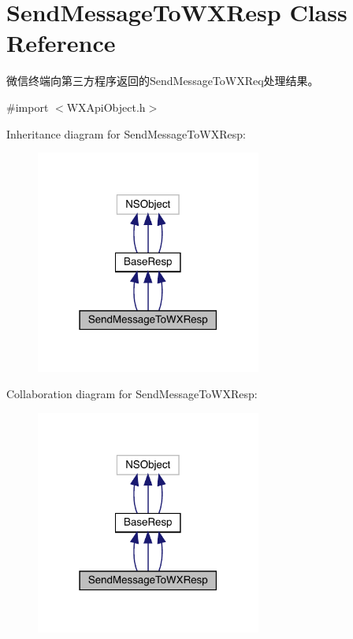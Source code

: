 \hypertarget{interface_send_message_to_w_x_resp}{}\section{Send\+Message\+To\+W\+X\+Resp Class Reference}
\label{interface_send_message_to_w_x_resp}


微信终端向第三方程序返回的\+Send\+Message\+To\+W\+X\+Req处理结果。  




{\ttfamily \#import $<$W\+X\+Api\+Object.\+h$>$}



Inheritance diagram for Send\+Message\+To\+W\+X\+Resp\+:\nopagebreak
\begin{figure}[H]
\begin{center}
\leavevmode
\includegraphics[width=210pt]{interface_send_message_to_w_x_resp__inherit__graph}
\end{center}
\end{figure}


Collaboration diagram for Send\+Message\+To\+W\+X\+Resp\+:\nopagebreak
\begin{figure}[H]
\begin{center}
\leavevmode
\includegraphics[width=210pt]{interface_send_message_to_w_x_resp__coll__graph}
\end{center}
\end{figure}
